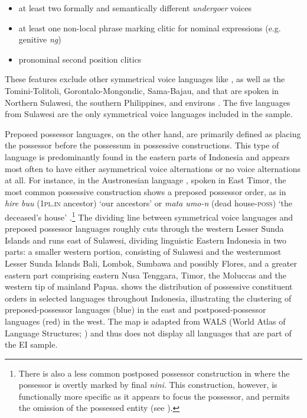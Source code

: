 \begin{itemize}
\item at least two formally and semantically different \textit{undergoer} voices
\item at least one non-local phrase marking clitic for nominal expressions (e.g.  genitive \textit{ng})
\item pronominal second position clitics
\end{itemize}

These features exclude other symmetrical voice languages like ,  as well as the Tomini-Tolitoli, Gorontalo-Mongondic, Sama-Bajau, and  that are spoken in Northern Sulawesi, the southern Philippines, and environs \citep[113]{Himmelmann2005austronesian}. The five languages from Sulawesi are the only symmetrical voice languages included in the sample.

Preposed possessor languages, on the other hand, are primarily defined as placing the possessor before the possessum in possessive constructions. This type of language is predominantly found in the eastern parts of Indonesia and appears most often to have either asymmetrical voice alternations or no voice alternations at all. For instance, in the Austronesian language , spoken in East Timor, the most common possessive construction shows a preposed possessor order, as in \textit{hire buu} (1\textsc{pl}.\textsc{in} ancestor) `our ancestors' or \textit{mata umo-n} (dead house-\textsc{poss}) `the deceased's house' \citep[31]{bowden2006} .\footnote{There is also a less common postposed possessor construction in  where the possessor is overtly marked by final \textit{nini}. This construction, however, is functionally more specific as it appears to focus the possessor, and permits the omission of the possessed entity (see \citealt[32]{bowden2006}).} The dividing line between symmetrical voice languages and preposed possessor languages roughly cuts through the western Lesser Sunda Islands and runs east of Sulawesi, dividing linguistic Eastern Indonesia in two parts: a smaller western portion, consisting of Sulawesi and the westernmost Lesser Sunda Islands Bali, Lombok, Sumbawa and possibly Flores, and a greater eastern part comprising eastern Nusa Tenggara, Timor, the Moluccas and the western tip of mainland Papua.  shows the distribution of possessive constituent orders in selected languages throughout Indonesia, illustrating the clustering of preposed-possessor languages (blue) in the east and postposed-possessor languages (red) in the west. The map is adapted from WALS (World Atlas of Language Structures; \citealt{wals-86}) and thus does not display all languages that are part of the EI sample.

